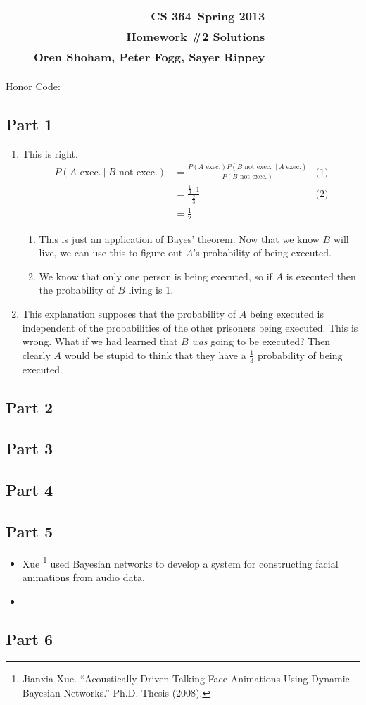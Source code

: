 \documentclass[11pt]{article}
\makeatletter
\newcommand{\course}{CS 364}
\newcommand{\semester}{Spring 2013}
\newcommand{\hwk}{Homework \#2 Solutions}
\newcommand{\student}{Oren Shoham, Peter Fogg, Sayer Rippey}
\renewcommand\maketitle{
  \begin{center}
    \begin{tabular*}{6.44in}{l @{\extracolsep{\fill}}c r}
      \bfseries  &  & \bfseries \course ~\semester \\
      \bfseries&  & \bfseries  \hwk  \\
      \bfseries   &   &  \bfseries \student \\ 
    \end{tabular*}
\end{center} }
\makeatother
\begin{document}
\maketitle
\thispagestyle{plain}


\noindent Honor Code: 

\subsection*{Part 1}
\begin{enumerate}
\item This is right.
  \begin{align*}
    P(A \text{ exec.}\ |\ B \text{ not exec.}) &= \frac{P(\text{$A$ exec.})P(\text{$B$ not exec. $\ |\ A$ exec.})}{P(\text{$B$ not exec.})} & \text{(1)} \\
    &= \frac{\frac{1}{3} \cdot 1}{\frac{2}{3}} & \text{(2)} \\
    &= \frac{1}{2}
  \end{align*}
  \begin{enumerate}[(1)]
    \item This is just an application of Bayes' theorem. Now that we know $B$ will live, we can use this to figure out $A$'s probability of being executed.
    \item We know that only one person is being executed, so if $A$ is executed then the probability of $B$ living is 1.
  \end{enumerate}
\item This explanation supposes that the probability of $A$ being executed is independent of the probabilities of the other prisoners being executed. This is wrong. What if we had learned that $B$ \emph{was} going to be executed? Then clearly $A$ would be stupid to think that they have a $\frac{1}{3}$ probability of being executed.
\end{enumerate}
\subsection*{Part 2}
\subsection*{Part 3}
\subsection*{Part 4}
\subsection*{Part 5}
\begin{itemize}
\item Xue \footnote{Jianxia Xue. ``Acoustically-Driven Talking Face Animations Using Dynamic Bayesian Networks.'' Ph.D. Thesis (2008).} used Bayesian networks to develop a system for constructing facial animations from audio data.
\item
\end{itemize}
\subsection*{Part 6}
\end{document}
